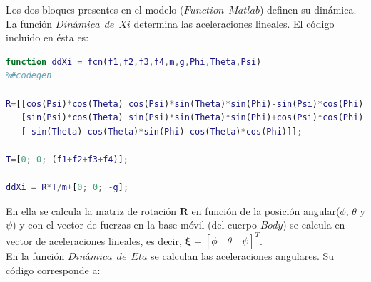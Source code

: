\documentclass[twoside,11pt]{book}
\begin{document}
Los dos bloques presentes en el modelo ($Function \>\> Matlab$) definen su dinámica. La función $Dinámica \>\> de \>\> Xi$ determina las aceleraciones lineales. El código incluido en ésta es:\\


\begin{lstlisting}[language=Matlab]
function ddXi = fcn(f1,f2,f3,f4,m,g,Phi,Theta,Psi)
%#codegen

R=[[cos(Psi)*cos(Theta) cos(Psi)*sin(Theta)*sin(Phi)-sin(Psi)*cos(Phi) cos(Psi)*sin(Theta)*cos(Phi)+sin(Psi)*sin(Phi)];
   [sin(Psi)*cos(Theta) sin(Psi)*sin(Theta)*sin(Phi)+cos(Psi)*cos(Phi) sin(Psi)*sin(Theta)*cos(Phi)-cos(Psi)*sin(Phi)];
   [-sin(Theta) cos(Theta)*sin(Phi) cos(Theta)*cos(Phi)]];

T=[0; 0; (f1+f2+f3+f4)];

ddXi = R*T/m+[0; 0; -g];
\end{lstlisting}

En ella se calcula la matriz de rotación $\mathbf{R}$ en función de la posición angular($\phi$, $\theta$ y $\psi$) y con el vector de fuerzas en la base móvil (del cuerpo $Body$) se calcula en vector de aceleraciones lineales, es decir, $\pmb{\ddot{\xi}}=\left[ \ddot{\phi} \quad \ddot{\theta} \quad \ddot{\psi} \right]^{T}$. \\

En la función $Dinámica \>\> de \>\> Eta$ se calculan las aceleraciones angulares. Su código corresponde a: 
\end{document}
